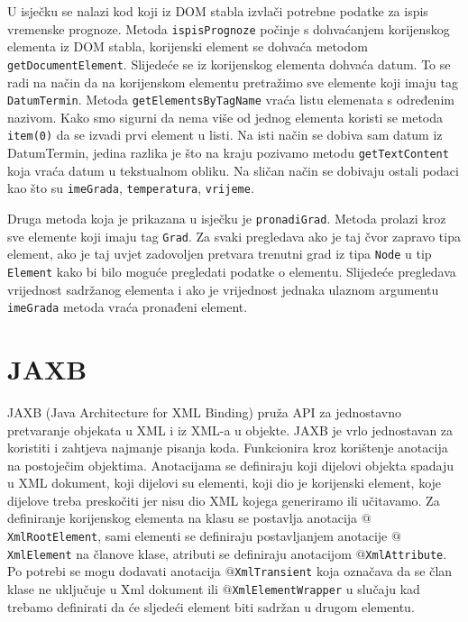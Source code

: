 \documentclass[]{foi}
\begin{document}
U isječku se nalazi kod koji iz DOM stabla izvlači potrebne podatke za ispis vremenske
prognoze. Metoda \texttt{ispisPrognoze} počinje s dohvaćanjem korijenskog elementa
iz DOM stabla, korijenski element se dohvaća metodom \texttt{getDocumentElement}.
Slijedeće se iz korijenskog elementa dohvaća datum. To se radi na način da na korijenskom
elementu pretražimo sve elemente koji imaju tag \texttt{DatumTermin}.
Metoda \texttt{getElementsByTagName} vraća listu elemenata s određenim nazivom. Kako
smo sigurni da nema više od jednog elementa koristi se metoda \texttt{item(0)}
da se izvadi prvi element u listi. Na isti način se dobiva sam datum iz DatumTermin,
jedina razlika je što na kraju pozivamo metodu \texttt{getTextContent} koja vraća
datum u tekstualnom obliku. Na sličan način se dobivaju ostali podaci kao što su
\texttt{imeGrada}, \texttt{temperatura}, \texttt{vrijeme}.

Druga metoda koja je prikazana u isječku je \texttt{pronadiGrad}. Metoda prolazi kroz
sve elemente koji imaju tag \texttt{Grad}. Za svaki pregledava ako je taj čvor zapravo
tipa element, ako je taj uvjet zadovoljen pretvara trenutni grad iz tipa \texttt{Node}
u tip \texttt{Element} kako bi bilo moguće pregledati podatke o elementu. Slijedeće
pregledava vrijednost sadržanog elementa i ako je vrijednost jednaka ulaznom argumentu
\texttt{imeGrada} metoda vraća pronađeni element.

\section{JAXB}
JAXB (Java Architecture for XML Binding) pruža API za jednostavno pretvaranje objekata
u XML i iz XML-a u objekte. JAXB je vrlo jednostavan za koristiti i zahtjeva najmanje
pisanja koda. Funkcionira kroz korištenje anotacija na postoječim objektima. Anotacijama
se definiraju koji dijelovi objekta spadaju u XML dokument, koji dijelovi su elementi,
koji dio je korijenski element, koje dijelove treba preskočiti jer nisu dio XML kojega
generiramo ili učitavamo. Za definiranje korijenskog elementa na klasu se postavlja
anotacija \texttt{$@$XmlRootElement}, sami elementi se definiraju postavljanjem anotacije
\texttt{$@$XmlElement} na članove klase, atributi se definiraju anotacijom
\texttt{$@$XmlAttribute}. Po potrebi se mogu dodavati anotacija \texttt{$@$XmlTransient}
koja označava da se član klase ne uključuje u Xml dokument ili \texttt{$@$XmlElementWrapper}
u slučaju kad trebamo definirati da će sljedeći element biti sadržan u drugom elementu.
\end{document}
